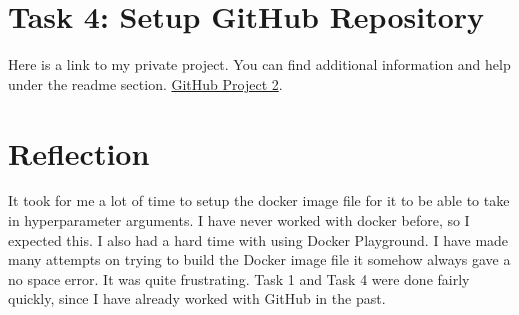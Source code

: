 \documentclass{article}
\begin{document}
\section{Task 4: Setup GitHub Repository}
Here is a link to my private project. You can find additional information and help under the readme section.
\href{https://github.com/JDCarona/project2-mlops}{GitHub Project 2}.




\section{Reflection}
It took for me a lot of time to setup the docker image file for it to be able to take in hyperparameter arguments.
I have never worked with docker before, so I expected this. I also had a hard time with using Docker Playground. 
I have made many attempts on trying to build the Docker image file it somehow always gave a no space error. It was quite frustrating.
Task 1 and Task 4 were done fairly quickly, since I have already worked with GitHub in the past.
\end{document}
